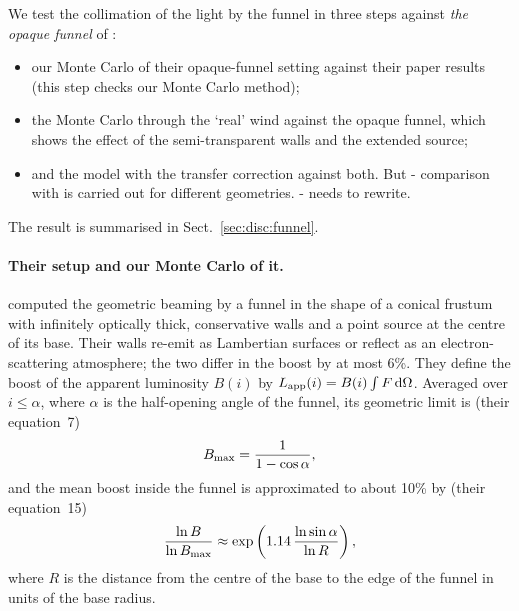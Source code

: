 We test the collimation of the light by the funnel in three steps against \textit{the opaque funnel} of \citet{Ahlberg2026}: 
\begin{itemize}
    \item[] our Monte Carlo of their opaque-funnel setting against their paper results (this step checks our Monte Carlo method);
    \item[]  the Monte Carlo through the `real' wind  against the opaque funnel, which shows the effect of the semi-transparent walls and the extended source;
    \item[]and the model with the transfer correction against both.
    But - comparison with \cite{Ahlberg2026} is carried out for different geometries. - needs to rewrite.
\end{itemize}

The result is summarised in Sect.~\ref{sec:disc:funnel}.

\paragraph{Their setup and our Monte Carlo of it.}
\citet{Ahlberg2026} computed the geometric beaming by a funnel in the shape of a conical frustum with infinitely optically thick, conservative walls and a point source at the centre of its base.
Their walls re-emit as Lambertian surfaces or reflect as an electron-scattering atmosphere; the two differ in the boost by at most 6\%.
They define the boost of the apparent luminosity $B(i)$ by $L_{\rm app}(i) = B(i) \int F\,{\rm d}\Omega$.
Averaged over $i \le \alpha$, where $\alpha$ is the half-opening angle of the funnel, its geometric limit is (their equation~7)
\begin{equation}
B_{\rm max} = \frac{1}{1 - \cos\alpha} ,
\label{eq:mc_Bmax}
\end{equation}
and the mean boost inside the funnel is approximated to about 10\% by (their equation~15)
\begin{equation}
\frac{\ln B}{\ln B_{\rm max}} \approx \exp\left(1.14\,\frac{\ln\sin\alpha}{\ln R}\right) ,
\label{eq:mc_AhlbergB}
\end{equation}
where $R$ is the distance from the centre of the base to the edge of the funnel in units of the base radius.

